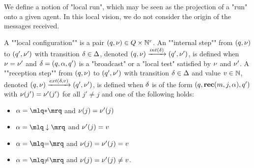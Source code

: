 We define a notion of "local run", which may be seen as the projection of a "run" onto a given agent. In this local vision, we do not consider the origin of the messages received.
	
\AP A ""local configuration"" is a pair $(q, \nu) \in Q \times \mathbb{N}^r$.  
\AP An ""internal step"" from $(q,\nu)$ to $(q',\nu')$ with transition $\delta \in \Delta$, denoted $(q,\localdata) \intstep{\atrans} (q',\localdata')$, is defined when $\nu = \nu'$ and $\delta =(q, \alpha, q')$ is a "broadcast" or a "local test" satisfied by $\nu$ and $\nu'$.  
\AP A ""reception step"" from $(q,\nu)$ to $(q',\nu')$ with transition $\delta \in \Delta$ and value $v \in \mathbb{N}$, denoted $(q,\localdata) \extbr{\atrans}{\aval} (q',\localdata')$, is defined when $\delta$ is of the form $(q,\textbf{rec}(m, j, \alpha),q')$ with $\nu(j') = \nu'(j')$ for all $j' \neq j$ and one of the following holds:
	
	\begin{minipage}[t]{6cm}
		\begin{itemize}
			\item $\anact = \quotemarks{\dummyact}$ 
			and $\nu(j) = \nu'(j)$
			\item $\anact = \quotemarks{\enregact}$ and $\nu'(j) = v$
		\end{itemize}
	\end{minipage}
	\begin{minipage}[t]{6cm}
		\begin{itemize}
			\item $\anact = \quotemarks{\eqtestact}$ and $\nu(j) = \nu'(j)= v$
			\item $\anact = \quotemarks{\diseqtestact}$ and $\nu(j) = \nu'(j) \ne v$.
		\end{itemize}
	\end{minipage}
	

